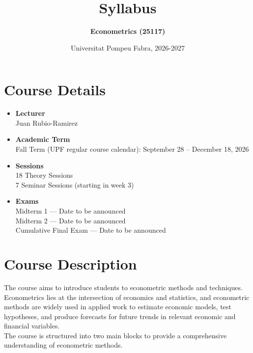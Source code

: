 \documentclass[12pt]{article}
\title{\textbf{Syllabus}}
\author{\textbf{Econometrics (25117)}}
\date{Universitat Pompeu Fabra, 2026-2027}
\begin{document}
\maketitle

\section*{Course Details}
\begin{itemize}
    \item \textbf{Lecturer}\\
    Juan Rubio-Ramirez
    \item \textbf{Academic Term}\\
    Fall Term (UPF regular course calendar): September 28 -- December 18, 2026
    \item \textbf{Sessions}\\
    18 Theory Sessions\\
    7 Seminar Sessions (starting in week 3)
    \item \textbf{Exams}\\
    Midterm 1 --- Date to be announced\\
    Midterm 2 --- Date to be announced\\
    Cumulative Final Exam --- Date to be announced
\end{itemize}
\section*{Course Description}
The course aims to introduce students to econometric methods and techniques. Econometrics lies at the intersection of economics and statistics, and econometric methods are widely used in applied work to estimate economic models, test hypotheses, and produce forecasts for future trends in relevant economic and financial variables.\\

The course is structured into two main blocks to provide a comprehensive understanding of econometric methods.
\end{document}
